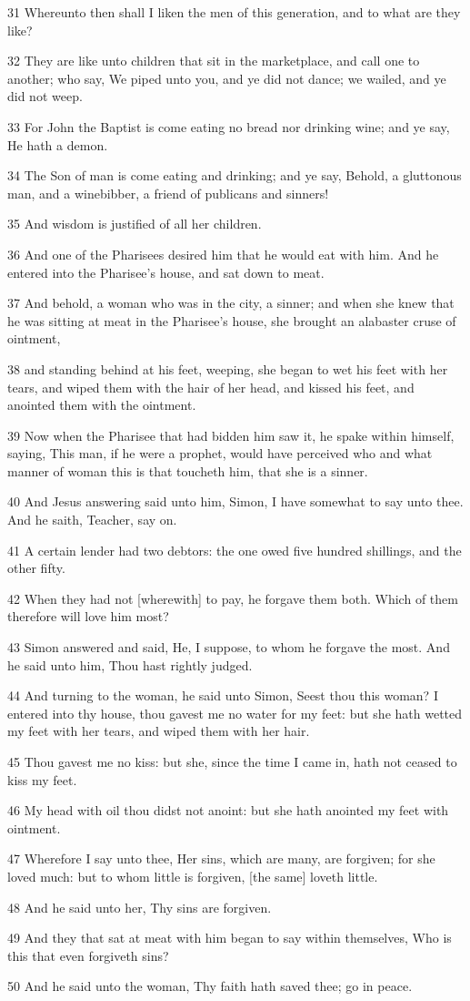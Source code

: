 \par 31 Whereunto then shall I liken the men of this generation, and to what are they like?
\par 32 They are like unto children that sit in the marketplace, and call one to another; who say, We piped unto you, and ye did not dance; we wailed, and ye did not weep.
\par 33 For John the Baptist is come eating no bread nor drinking wine; and ye say, He hath a demon.
\par 34 The Son of man is come eating and drinking; and ye say, Behold, a gluttonous man, and a winebibber, a friend of publicans and sinners!
\par 35 And wisdom is justified of all her children.
\par 36 And one of the Pharisees desired him that he would eat with him. And he entered into the Pharisee's house, and sat down to meat.
\par 37 And behold, a woman who was in the city, a sinner; and when she knew that he was sitting at meat in the Pharisee's house, she brought an alabaster cruse of ointment,
\par 38 and standing behind at his feet, weeping, she began to wet his feet with her tears, and wiped them with the hair of her head, and kissed his feet, and anointed them with the ointment.
\par 39 Now when the Pharisee that had bidden him saw it, he spake within himself, saying, This man, if he were a prophet, would have perceived who and what manner of woman this is that toucheth him, that she is a sinner.
\par 40 And Jesus answering said unto him, Simon, I have somewhat to say unto thee. And he saith, Teacher, say on.
\par 41 A certain lender had two debtors: the one owed five hundred shillings, and the other fifty.
\par 42 When they had not [wherewith] to pay, he forgave them both. Which of them therefore will love him most?
\par 43 Simon answered and said, He, I suppose, to whom he forgave the most. And he said unto him, Thou hast rightly judged.
\par 44 And turning to the woman, he said unto Simon, Seest thou this woman? I entered into thy house, thou gavest me no water for my feet: but she hath wetted my feet with her tears, and wiped them with her hair.
\par 45 Thou gavest me no kiss: but she, since the time I came in, hath not ceased to kiss my feet.
\par 46 My head with oil thou didst not anoint: but she hath anointed my feet with ointment.
\par 47 Wherefore I say unto thee, Her sins, which are many, are forgiven; for she loved much: but to whom little is forgiven, [the same] loveth little.
\par 48 And he said unto her, Thy sins are forgiven.
\par 49 And they that sat at meat with him began to say within themselves, Who is this that even forgiveth sins?
\par 50 And he said unto the woman, Thy faith hath saved thee; go in peace.

